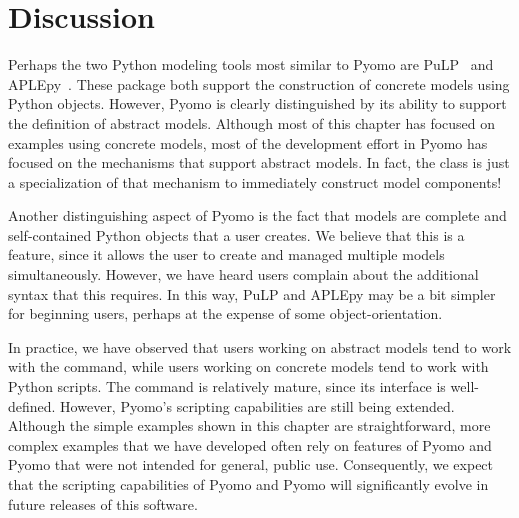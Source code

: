 \section{Discussion}

Perhaps the two Python modeling tools most similar to Pyomo are
PuLP~\cite{PuLP} and APLEpy~\cite{APLEpy}.  These package both support
the construction of concrete models using Python objects.  However,
Pyomo is clearly distinguished by its ability to support the definition
of abstract models.  Although most of this chapter has focused on
examples using concrete models, most of the development effort in Pyomo
has focused on the mechanisms that support abstract models.  In fact,
the  class is just a specialization of that mechanism
to immediately construct model components!

Another distinguishing aspect of Pyomo is the fact that models are complete
and self-contained Python objects that a user creates.  We believe that this 
is a feature, since it allows the user to create and managed multiple models 
simultaneously. However, we have heard users complain about the additional 
syntax that this requires. In this way, PuLP and APLEpy may be a bit simpler 
for beginning users, perhaps at the expense of some object-orientation.

In practice, we have observed that users working on abstract models
tend to work with the  command, while users working on
concrete models tend to work with Python scripts.  The 
command is relatively mature, since its interface is well-defined.
However, Pyomo's scripting capabilities are still being extended.
Although the simple examples shown in this chapter are straightforward,
more complex examples that we have developed often rely on features of
Pyomo and Pyomo that were not intended for general, public use.  
Consequently, we expect that the scripting capabilities of Pyomo and 
Pyomo will significantly evolve in future releases of this software.


